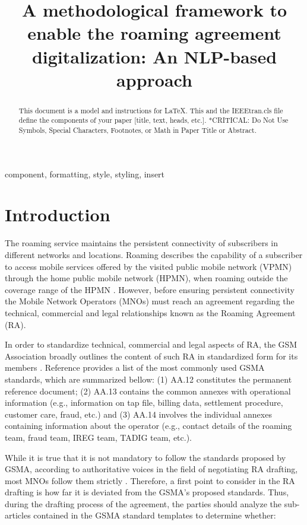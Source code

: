 \documentclass[conference]{style/IEEEtran}
\begin{document}
\title{A methodological framework to enable the roaming agreement digitalization: An NLP-based approach\\}

\maketitle

\begin{abstract}
This document is a model and instructions for \LaTeX.
This and the IEEEtran.cls file define the components of your paper [title, text, heads, etc.]. *CRITICAL: Do Not Use Symbols, Special Characters, Footnotes, 
or Math in Paper Title or Abstract.
\end{abstract}

\begin{IEEEkeywords}
component, formatting, style, styling, insert
\end{IEEEkeywords}

\section{Introduction}
The roaming service maintains the persistent connectivity of subscribers in different networks and locations. Roaming describes the capability of a subscriber to access mobile services offered by the visited public mobile network (VPMN) through the home public mobile network (HPMN), when roaming outside the coverage range of the HPMN \cite{Tanaka2013}. However, before ensuring persistent connectivity the Mobile Network Operators (MNOs) must reach an agreement regarding the technical, commercial and legal relationships known as the Roaming Agreement (RA).

In order to standardize technical, commercial and legal aspects of RA, the GSM Association broadly outlines the content of such RA in standardized form for its members \cite{Ferwerda2018}. Reference \cite{ROCCO2017} provides a list of the most commonly used GSMA standards, which are summarized bellow: (1) AA.12 constitutes the permanent reference document; (2) AA.13 contains the common annexes with operational information (e.g., information on tap file, billing data, settlement procedure, customer care, fraud, etc.) and (3) AA.14 involves the individual annexes containing information about the operator (e.g., contact details of the roaming team, fraud team, IREG team, TADIG team, etc.).

While it is true that it is not mandatory to follow the standards proposed by GSMA, according to authoritative voices in the field of negotiating RA drafting, most MNOs follow them strictly \cite{ROCCO2017a}. Therefore, a first point to consider in the RA drafting is how far it is deviated from the GSMA's proposed standards. Thus, during the drafting process of the agreement, the parties should analyze the sub-articles contained in the GSMA standard templates to determine whether:
\end{document}
